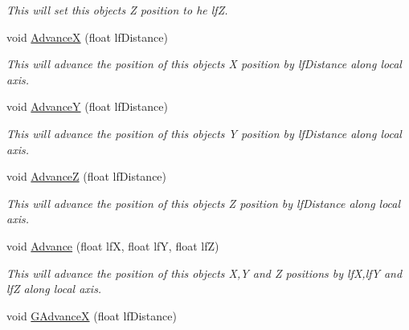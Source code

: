 \begin{DoxyCompactItemize}
\begin{DoxyCompactList}\small\item\em This will set this objects Z position to he lfZ. \end{DoxyCompactList}\item 
\hypertarget{classc_camera_matrix4_a4a07cdf5cb578378193487a1ac304380}{
void \hyperlink{classc_camera_matrix4_a4a07cdf5cb578378193487a1ac304380}{AdvanceX} (float lfDistance)}
\label{classc_camera_matrix4_a4a07cdf5cb578378193487a1ac304380}

\begin{DoxyCompactList}\small\item\em This will advance the position of this objects X position by lfDistance along local axis. \end{DoxyCompactList}\item 
\hypertarget{classc_camera_matrix4_a1c644144c6673fad0d45ac2a28065edb}{
void \hyperlink{classc_camera_matrix4_a1c644144c6673fad0d45ac2a28065edb}{AdvanceY} (float lfDistance)}
\label{classc_camera_matrix4_a1c644144c6673fad0d45ac2a28065edb}

\begin{DoxyCompactList}\small\item\em This will advance the position of this objects Y position by lfDistance along local axis. \end{DoxyCompactList}\item 
\hypertarget{classc_camera_matrix4_a18915056c461b31b5ea916715fa2582f}{
void \hyperlink{classc_camera_matrix4_a18915056c461b31b5ea916715fa2582f}{AdvanceZ} (float lfDistance)}
\label{classc_camera_matrix4_a18915056c461b31b5ea916715fa2582f}

\begin{DoxyCompactList}\small\item\em This will advance the position of this objects Z position by lfDistance along local axis. \end{DoxyCompactList}\item 
\hypertarget{classc_camera_matrix4_acd0e691c270f18c80965bf8da4442d5b}{
void \hyperlink{classc_camera_matrix4_acd0e691c270f18c80965bf8da4442d5b}{Advance} (float lfX, float lfY, float lfZ)}
\label{classc_camera_matrix4_acd0e691c270f18c80965bf8da4442d5b}

\begin{DoxyCompactList}\small\item\em This will advance the position of this objects X,Y and Z positions by lfX,lfY and lfZ along local axis. \end{DoxyCompactList}\item 
\hypertarget{classc_camera_matrix4_a69ef5c53bd239d2f1041ac9330c2cc08}{
void \hyperlink{classc_camera_matrix4_a69ef5c53bd239d2f1041ac9330c2cc08}{GAdvanceX} (float lfDistance)}
\label{classc_camera_matrix4_a69ef5c53bd239d2f1041ac9330c2cc08}


\end{DoxyCompactItemize}
